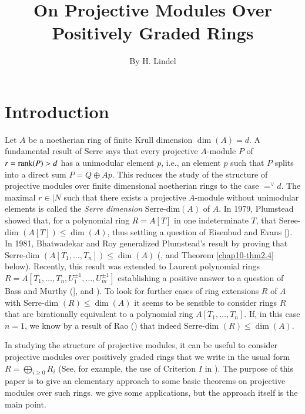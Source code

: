\title{On Projective Modules Over Positively Graded Rings}\label{chap10}

\author{By H. Lindel}

\date{}
\maketitle

\setcounter{page}{195}

\setcounter{pageoriginal}{250}
\section*{Introduction}\pageoriginale

Let $A$ be a noetherian ring of finite Krull dimension $\dim(A)=d$.  A
fundamental result of Serre says that every projective $A$-module $P$
of $r=\operatorname{rank} (P)>d$ has a unimodular element $p$, i.e., an element $p$
such that $P$ splits into a direct sum $P=Q\oplus Ap$. This reduces
the study of the structure of projective modules over finite
dimensional noetherian rings to the case
$\displaystyle\mathop{=}^{\vee} d$. The maximal $r\in |N$ such that
there exists a projective $A$-module without unimodular elements is
called the {\em Serre dimension} Serre-dim$(A)$ of $A$. In 1979,
Plumstead showed that, for a polynomial ring $R=A[T]$ in one
indeterminate $T$, that Seree-dim $(A[T])\leq \dim(A)$, thus settling
a question of Eisenbud and Evans [\cite{chap10-Pl}). In 1981,
Bhatwadekar and Roy generalized Plumstead's result by proving that
Serre-dim $(A[T_{1},\ldots,T_{n}])\leq \dim(A)$ (\cite[Theorem
3.1]{chap10-Bh/Ro}, and Theorem \ref{chap10-thm2.4}
below). Recently, this result was extended to Laurent polynomial rings
$R=A[T_{1},\ldots,T_{n},U^{\pm 1}_{1},\ldots,U^{\pm 1}_{m}]$
establishing a positive answer to a question of Bass and Murthy
(\cite[Theorem 4.1]{chap10-Bh/Li/Ra}],  and
\cite[\S\ 9]{chap10-Ba/Mu}). To look for further cases of ring
extensions $R$ of $A$ with Serre-dim $(R)\leq \dim(A)$\pageoriginale
it seems to be sensible to consider rings $R$ that are birationally
equivalent to a polynomial ring $A[T_{1},\ldots,T_{n}]$. If, in this
case $n=1$, we know by a result of Rao (\cite[Theorem 1.1]{chap10-Ra})
that indeed Serre-dim $(R)\leq \dim (A)$.   

In studying the structure of projective modules, it can be useful to
consider projective modules over positively graded rings that we write
in the usual form $R=\bigoplus\limits_{i\geq 0}R_{i}$ (See, for
example, the use of Criterion $I$ in \cite{chap10-Bh/Li/Ra}). The
purpose of this paper is to give an elementary approach to some basic
theorems on projective modules over such rings. we give some
applications, but the approach itself is the main point. 

